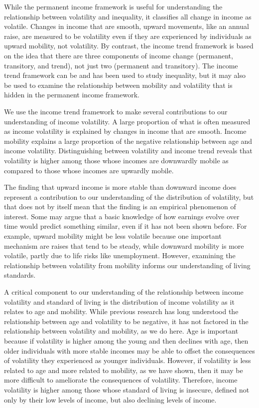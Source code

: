 \documentclass[12pt]{article}
\begin{document}
While the permanent income framework is useful for understanding the relationship between volatility and inequality, it classifies all change in income as volatile. Changes in income that are smooth, upward movements, like an annual raise, are measured to be volatility even if they are experienced by individuals as upward mobility, not volatility. By contrast, the income trend framework is based on the idea that there are three components of income change (permanent, transitory, and trend), not just two (permanent and transitory). The income trend framework can be and has been used to study inequality, but it may also be used to examine the relationship between mobility and volatility that is hidden in the permanent income framework.

We use the income trend framework to make several contributions to our understanding of income volatility. A large proportion of what is often measured as income volatility is explained by changes in income that are smooth. Income mobility explains a large proportion of the negative relationship between age and income volatility. Distinguishing between volatility and income trend reveals that volatility is higher among those whose incomes are downwardly mobile as compared to those whose incomes are upwardly mobile.

The finding that upward income is more stable than downward income does represent a contribution to our understanding of the distribution of volatility, but that does not by itself mean that the finding is an empirical phenomenon of interest. Some may argue that a basic knowledge of how earnings evolve over time would predict something similar, even if it has not been shown before. For example, upward mobility might be less volatile because one important mechanism are raises that tend to be steady, while downward mobility is more volatile, partly due to life risks like unemployment. However, examining the relationship between volatility from mobility informs our understanding of living standards.

A critical component to our understanding of the relationship between income volatility and standard of living is the distribution of income volatility as it relates to age and mobility. While previous research has long understood the relationship between age and volatility to be negative, it has not factored in the relationship between volatility and mobility, as we do here. Age is important because if volatility is higher among the young and then declines with age, then older individuals with more stable incomes may be able to offset the consequences of volatility they experienced as younger individuals. However, if volatility is less related to age and more related to mobility, as we have shown, then it may be more difficult to ameliorate the consequences of volatility. Therefore, income volatility is higher among those whose standard of living is insecure, defined not only by their low levels of income, but also declining levels of income.
\end{document}
